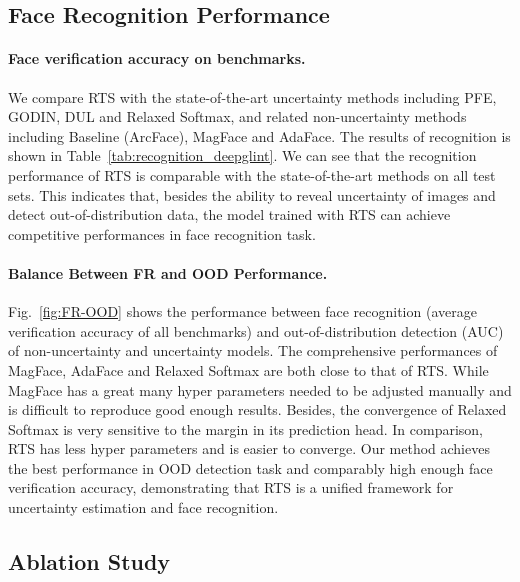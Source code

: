 \documentclass[letterpaper]{article} %
\begin{document}
\vspace{-0.78mm}
\subsection{Face Recognition Performance}
\label{ssec:face recognition}
\paragraph{Face verification accuracy on benchmarks.} We compare RTS with the state-of-the-art uncertainty methods including PFE, GODIN, DUL and Relaxed Softmax, and related non-uncertainty methods including Baseline (ArcFace), MagFace and AdaFace.
The results of recognition is shown in Table~\ref{tab:recognition_deepglint}. We can see that the recognition performance of RTS is comparable with the state-of-the-art methods on all test sets. This indicates that, besides the ability to reveal uncertainty of images and detect out-of-distribution data, the model trained with RTS can achieve competitive performances in face recognition task.

\paragraph{Balance Between FR and OOD Performance. } Fig.~\ref{fig:FR-OOD} shows the performance between face recognition (average verification accuracy of all benchmarks) and out-of-distribution detection (AUC) of non-uncertainty and uncertainty models. The comprehensive performances of MagFace, AdaFace and Relaxed Softmax are both close to that of RTS. While MagFace has a great many hyper parameters needed to be adjusted manually and is difficult to reproduce good enough results. Besides, the convergence of Relaxed Softmax is very sensitive to the margin in its prediction head. In comparison, RTS has less hyper parameters and is easier to converge. Our method achieves the best performance in OOD detection task and comparably high enough face verification accuracy, demonstrating that RTS is a unified framework for uncertainty estimation and face recognition.










\vspace{-1.62mm}
\subsection{Ablation Study}
\label{ssec:ablation}
\end{document}
